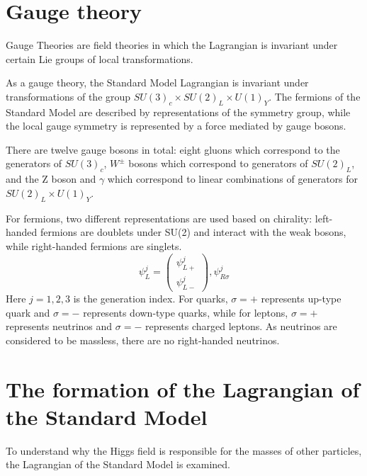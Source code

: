 \section{Gauge theory}
\par Gauge Theories are field theories in which the Lagrangian is invariant under certain Lie groups of local transformations.
\par As a gauge theory, the Standard Model Lagrangian is invariant under transformations of the group $SU(3)_c \times SU(2)_L \times U(1)_Y$. The fermions of the Standard Model are described by representations of the symmetry group, while the local gauge symmetry is represented by a force mediated by gauge bosons.

\par There are twelve gauge bosons in total: eight gluons which correspond to the generators of $SU(3)_c$, $W^{\pm}$ bosons which correspond to generators of $SU(2)_L$, and the Z boson and $\gamma$ which correspond to linear combinations of generators for $SU(2)_L \times U(1)_Y$.

\par For fermions, two different representations are used based on chirality: left-handed fermions are doublets under SU(2) and interact with the weak bosons, while right-handed fermions are singlets.
\begin{equation}
  \psi_L^{j}=\left( \begin{smallmatrix} \psi_{L+}^{j}\\ \psi_{L-}^{j} \end{smallmatrix}\right),  \psi_{R\sigma}^{j}
  \label{eq:fermion}
\end{equation}
Here $j=1,2,3$ is the generation index. For quarks, $\sigma=+$ represents up-type quark and $\sigma=-$ represents down-type quarks, while for leptons, $\sigma=+$ represents neutrinos and $\sigma=-$ represents charged leptons. As neutrinos are considered to be massless, there are no right-handed neutrinos.

\section{The formation of the Lagrangian of the Standard Model}
\par To understand why the Higgs field is responsible for the masses of other particles, the Lagrangian of the Standard Model is examined.

